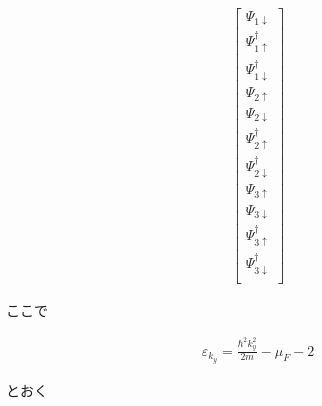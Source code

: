 \documentclass{jsarticle}
\begin{document}
\begin{align}
\begin{bmatrix}
				\Psi_{1\downarrow} \\
				\Psi_{1\uparrow}^\dagger \\
				\Psi_{1\downarrow}^\dagger \\
				\Psi_{2\uparrow} \\
				\Psi_{2\downarrow} \\
				\Psi_{2\uparrow}^\dagger \\
				\Psi_{2\downarrow}^\dagger \\
				\Psi_{3\uparrow} \\
				\Psi_{3\downarrow} \\
				\Psi_{3\uparrow}^\dagger \\
				\Psi_{3\downarrow}^\dagger \\
			\end{bmatrix}
		\end{align}

		ここで

		\begin{align}
			\varepsilon_{k_y}=\frac{\hbar^2k_y^2}{2m}-\mu_F-2
		\end{align}

		とおく
\end{document}
